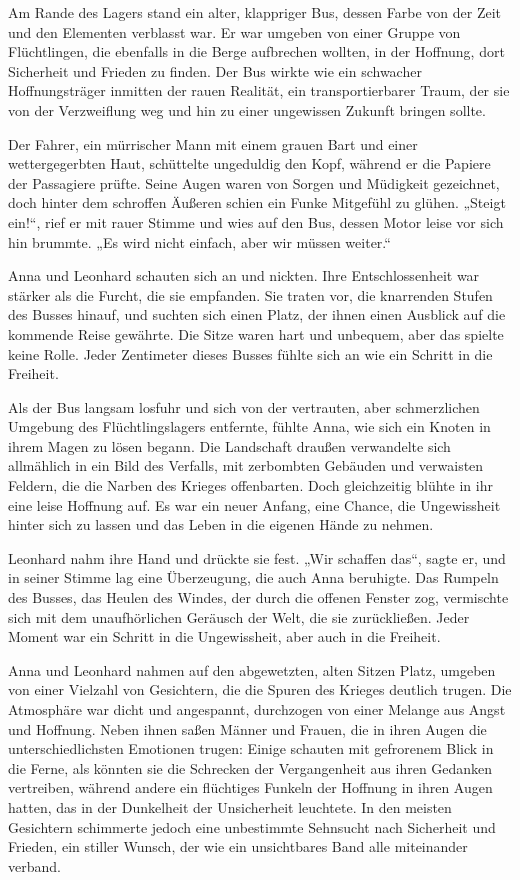 \documentclass[
]{article}
\begin{document}
Am Rande des Lagers stand ein alter, klappriger Bus, dessen Farbe von
der Zeit und den Elementen verblasst war. Er war umgeben von einer
Gruppe von Flüchtlingen, die ebenfalls in die Berge aufbrechen wollten,
in der Hoffnung, dort Sicherheit und Frieden zu finden. Der Bus wirkte
wie ein schwacher Hoffnungsträger inmitten der rauen Realität, ein
transportierbarer Traum, der sie von der Verzweiflung weg und hin zu
einer ungewissen Zukunft bringen sollte.

Der Fahrer, ein mürrischer Mann mit einem grauen Bart und einer
wettergegerbten Haut, schüttelte ungeduldig den Kopf, während er die
Papiere der Passagiere prüfte. Seine Augen waren von Sorgen und
Müdigkeit gezeichnet, doch hinter dem schroffen Äußeren schien ein Funke
Mitgefühl zu glühen. „Steigt ein!{\kern0pt}``, rief er mit rauer Stimme
und wies auf den Bus, dessen Motor leise vor sich hin brummte. „Es wird
nicht einfach, aber wir müssen weiter.``

Anna und Leonhard schauten sich an und nickten. Ihre Entschlossenheit
war stärker als die Furcht, die sie empfanden. Sie traten vor, die
knarrenden Stufen des Busses hinauf, und suchten sich einen Platz, der
ihnen einen Ausblick auf die kommende Reise gewährte. Die Sitze waren
hart und unbequem, aber das spielte keine Rolle. Jeder Zentimeter dieses
Busses fühlte sich an wie ein Schritt in die Freiheit.

Als der Bus langsam losfuhr und sich von der vertrauten, aber
schmerzlichen Umgebung des Flüchtlingslagers entfernte, fühlte Anna, wie
sich ein Knoten in ihrem Magen zu lösen begann. Die Landschaft draußen
verwandelte sich allmählich in ein Bild des Verfalls, mit zerbombten
Gebäuden und verwaisten Feldern, die die Narben des Krieges offenbarten.
Doch gleichzeitig blühte in ihr eine leise Hoffnung auf. Es war ein
neuer Anfang, eine Chance, die Ungewissheit hinter sich zu lassen und
das Leben in die eigenen Hände zu nehmen.

Leonhard nahm ihre Hand und drückte sie fest. „Wir schaffen das``, sagte
er, und in seiner Stimme lag eine Überzeugung, die auch Anna beruhigte.
Das Rumpeln des Busses, das Heulen des Windes, der durch die offenen
Fenster zog, vermischte sich mit dem unaufhörlichen Geräusch der Welt,
die sie zurückließen. Jeder Moment war ein Schritt in die Ungewissheit,
aber auch in die Freiheit.

Anna und Leonhard nahmen auf den abgewetzten, alten Sitzen Platz,
umgeben von einer Vielzahl von Gesichtern, die die Spuren des Krieges
deutlich trugen. Die Atmosphäre war dicht und angespannt, durchzogen von
einer Melange aus Angst und Hoffnung. Neben ihnen saßen Männer und
Frauen, die in ihren Augen die unterschiedlichsten Emotionen trugen:
Einige schauten mit gefrorenem Blick in die Ferne, als könnten sie die
Schrecken der Vergangenheit aus ihren Gedanken vertreiben, während
andere ein flüchtiges Funkeln der Hoffnung in ihren Augen hatten, das in
der Dunkelheit der Unsicherheit leuchtete. In den meisten Gesichtern
schimmerte jedoch eine unbestimmte Sehnsucht nach Sicherheit und
Frieden, ein stiller Wunsch, der wie ein unsichtbares Band alle
miteinander verband.
\end{document}
